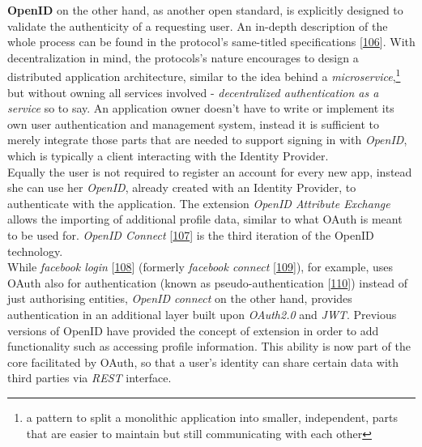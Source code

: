 \documentclass[12pt,english,a4paper,titlepage,cleardoublepage=empty,dottedtoc]{report}
\begin{document}
\textbf{OpenID} on the other hand, as another open standard, is
explicitly designed to validate the authenticity of a requesting user.
An in-depth description of the whole process can be found in the
protocol's same-titled specifications
{[}\protect\hyperlink{ref-web_spec_openid-spec-index}{106}{]}. With
decentralization in mind, the protocols's nature encourages to design a
distributed application architecture, similar to the idea behind a
\emph{microservice},\footnote{a pattern to split a monolithic
  application into smaller, independent, parts that are easier to
  maintain but still communicating with each other} but without owning
all services involved - \emph{decentralized authentication as a service}
so to say. An application owner doesn't have to write or implement its
own user authentication and management system, instead it is sufficient
to merely integrate those parts that are needed to support signing in
with \emph{OpenID}, which is typically a client interacting with the
Identity Provider.\\
Equally the user is not required to register an account for every new
app, instead she can use her \emph{OpenID}, already created with an
Identity Provider, to authenticate with the application. The extension
\emph{OpenID Attribute Exchange} allows the importing of additional
profile data, similar to what OAuth is meant to be used for.
\emph{OpenID Connect}
{[}\protect\hyperlink{ref-web_spec_openid-connect-1}{107}{]} is the
third iteration of the OpenID technology.\\
While \emph{facebook login}
{[}\protect\hyperlink{ref-web_docs_facebook-login}{108}{]} (formerly
\emph{facebook connect}
{[}\protect\hyperlink{ref-web_2017_wikipedia_facebook-connect}{109}{]}),
for example, uses OAuth also for authentication (known as
pseudo-authentication
{[}\protect\hyperlink{ref-web_2017_wikipedia_openid-vs-pseudo-oauth}{110}{]})
instead of just authorising entities, \emph{OpenID connect} on the other
hand, provides authentication in an additional layer built upon
\emph{OAuth2.0} and \emph{JWT}. Previous versions of OpenID have
provided the concept of extension in order to add functionality such as
accessing profile information. This ability is now part of the core
facilitated by OAuth, so that a user's identity can share certain data
with third parties via \emph{REST} interface.
\end{document}
